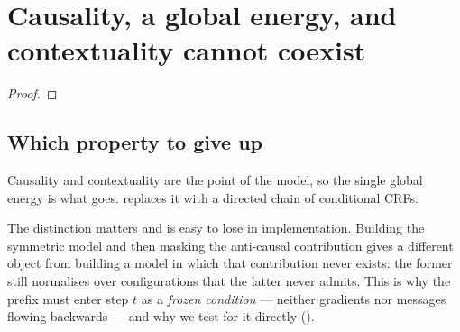 \section{Causality, a global energy, and contextuality cannot coexist}
\label{sec:impossibility}


\begin{definition}[Causality]
\label{def:causality}
\end{definition}

\begin{definition}
\label{def:global-energy}
\end{definition}

\begin{definition}[Contextuality]
\label{def:contextuality}
\end{definition}

\begin{theorem}[Trilemma]
\label{thm:trilemma}
\end{theorem}

\begin{proof}
\end{proof}

\subsection{Which property to give up}
\label{sec:which-to-give-up}

Causality and contextuality are the point of the model, so the single global energy is what
goes.  replaces it with a directed chain of conditional CRFs.

\begin{remark}
\label{rmk:never-formed}
The distinction matters and is easy to lose in implementation. Building the symmetric model and
then masking the anti-causal contribution gives a different object from building a model in
which that contribution never exists: the former still normalises over configurations that the
latter never admits. This is why the prefix must enter step $t$ as a \emph{frozen condition}
--- neither gradients nor messages flowing backwards --- and why we test for it directly
().
\end{remark}
